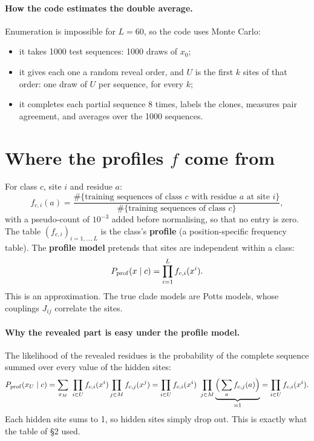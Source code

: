 \documentclass[11pt,a4paper]{article}
\begin{document}
\paragraph{How the code estimates the double average.} Enumeration is impossible for $L=60$, so the code uses Monte Carlo:
\begin{itemize}[nosep]
\item it takes 1000 test sequences: 1000 draws of $x_0$;
\item it gives each one a random reveal order, and $U$ is the first $k$ sites of that order: one draw of $U$ per
sequence, for every $k$;
\item it completes each partial sequence 8 times, labels the clones, measures pair agreement, and averages over the
1000 sequences.
\end{itemize}

\section{Where the profiles $f$ come from}
For class $c$, site $i$ and residue $a$:
\[
f_{c,i}(a)=\frac{\#\{\text{training sequences of class }c\text{ with residue }a\text{ at site }i\}}
{\#\{\text{training sequences of class }c\}},
\]
with a pseudo-count of $10^{-3}$ added before normalising, so that no entry is zero. The table $(f_{c,i})_{i=1,\dots,L}$ is
the class's \textbf{profile} (a position-specific frequency table). The \textbf{profile model} pretends that sites are
independent within a class:
\[
P_{\rm prof}(x\mid c)=\prod_{i=1}^Lf_{c,i}(x^i).
\]
This is an approximation. The true clade models are Potts models, whose couplings $J_{ij}$ correlate the sites.

\paragraph{Why the revealed part is easy under the profile model.} The likelihood of the revealed residues is the
probability of the complete sequence summed over every value of the hidden sites:
\[
P_{\rm prof}(x_U\mid c)=\sum_{x_M}\ \prod_{i\in U}f_{c,i}(x^i)\prod_{j\in M}f_{c,j}(x^j)
=\prod_{i\in U}f_{c,i}(x^i)\ \prod_{j\in M}\underbrace{\Big(\sum_af_{c,j}(a)\Big)}_{=1}
=\prod_{i\in U}f_{c,i}(x^i).
\]
Each hidden site sums to 1, so hidden sites simply drop out. This is exactly what the table of \S2 used.
\end{document}
